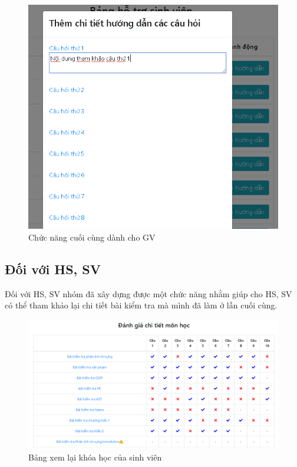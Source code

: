\begin{itemize}
	\begin{center}
		\begin{figure}[htp]
			\begin{center}
				\includegraphics[width=0.6\linewidth]{img/31}
			\end{center}
			\caption{Chức năng cuối cùng dành cho GV}
			\label{refhinh76}
		\end{figure}
	\end{center}

\end{itemize}

\vskip 6cm
\subsection{Đối với HS, SV}

Đối với HS, SV nhóm đã xây dựng được một chức năng nhằm giúp cho HS, SV có thể tham khảo lại chi tiết bài kiểm tra mà mình đã làm ở lần cuối cùng.

\begin{center}
	\begin{figure}[htp]
		\begin{center}
			\includegraphics[width=1\linewidth]{img/33}
		\end{center}
		\caption{Bảng xem lại khóa học của sinh viên}
		\label{refhinh77}
	\end{figure}
\end{center}

